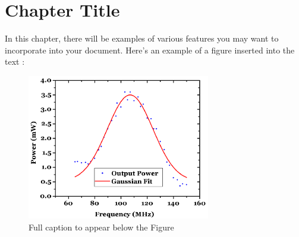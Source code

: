 
\cleardoublepage


\chapter{Chapter Title}
\label{makereference}

In this chapter, there will be examples of various features you
may want to incorporate into your document. Here's an example of a
figure inserted into the text \cite{MiSuperLibro}:

\begin{figure}[htb]%

    \includegraphics[height=2.5in]{Imagenes/graph.png}

    \caption[Optional: Short caption to appear in List of
    Figures]{Full caption to appear below the Figure}

    \label{figure1}
\end{figure}



